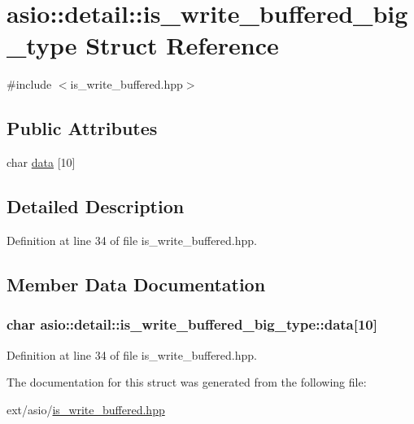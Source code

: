 \hypertarget{structasio_1_1detail_1_1is__write__buffered__big__type}{}\section{asio\+:\+:detail\+:\+:is\+\_\+write\+\_\+buffered\+\_\+big\+\_\+type Struct Reference}
\label{structasio_1_1detail_1_1is__write__buffered__big__type}


{\ttfamily \#include $<$is\+\_\+write\+\_\+buffered.\+hpp$>$}

\subsection*{Public Attributes}
\begin{DoxyCompactItemize}
\item 
char \hyperlink{structasio_1_1detail_1_1is__write__buffered__big__type_aaf9d35127737f41251438e2aeebb9abd}{data} \mbox{[}10\mbox{]}
\end{DoxyCompactItemize}


\subsection{Detailed Description}


Definition at line 34 of file is\+\_\+write\+\_\+buffered.\+hpp.



\subsection{Member Data Documentation}
\hypertarget{structasio_1_1detail_1_1is__write__buffered__big__type_aaf9d35127737f41251438e2aeebb9abd}{}
\subsubsection[{data}]{\setlength{\rightskip}{0pt plus 5cm}char asio\+::detail\+::is\+\_\+write\+\_\+buffered\+\_\+big\+\_\+type\+::data\mbox{[}10\mbox{]}}\label{structasio_1_1detail_1_1is__write__buffered__big__type_aaf9d35127737f41251438e2aeebb9abd}


Definition at line 34 of file is\+\_\+write\+\_\+buffered.\+hpp.



The documentation for this struct was generated from the following file\+:\begin{DoxyCompactItemize}
\item 
ext/asio/\hyperlink{is__write__buffered_8hpp}{is\+\_\+write\+\_\+buffered.\+hpp}\end{DoxyCompactItemize}
